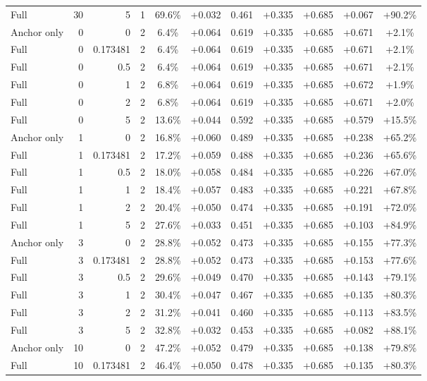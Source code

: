 \begin{table}[htbp]
\begin{tabular}{lrrrccccccc}
Full & 30 & 5 & 1 & 69.6\% & +0.032 & 0.461 & +0.335 & +0.685 & +0.067 & +90.2\% \\
Anchor only & 0 & 0 & 2 & 6.4\% & +0.064 & 0.619 & +0.335 & +0.685 & +0.671 & +2.1\% \\
Full & 0 & 0.173481 & 2 & 6.4\% & +0.064 & 0.619 & +0.335 & +0.685 & +0.671 & +2.1\% \\
Full & 0 & 0.5 & 2 & 6.4\% & +0.064 & 0.619 & +0.335 & +0.685 & +0.671 & +2.1\% \\
Full & 0 & 1 & 2 & 6.8\% & +0.064 & 0.619 & +0.335 & +0.685 & +0.672 & +1.9\% \\
Full & 0 & 2 & 2 & 6.8\% & +0.064 & 0.619 & +0.335 & +0.685 & +0.671 & +2.0\% \\
Full & 0 & 5 & 2 & 13.6\% & +0.044 & 0.592 & +0.335 & +0.685 & +0.579 & +15.5\% \\
Anchor only & 1 & 0 & 2 & 16.8\% & +0.060 & 0.489 & +0.335 & +0.685 & +0.238 & +65.2\% \\
Full & 1 & 0.173481 & 2 & 17.2\% & +0.059 & 0.488 & +0.335 & +0.685 & +0.236 & +65.6\% \\
Full & 1 & 0.5 & 2 & 18.0\% & +0.058 & 0.484 & +0.335 & +0.685 & +0.226 & +67.0\% \\
Full & 1 & 1 & 2 & 18.4\% & +0.057 & 0.483 & +0.335 & +0.685 & +0.221 & +67.8\% \\
Full & 1 & 2 & 2 & 20.4\% & +0.050 & 0.474 & +0.335 & +0.685 & +0.191 & +72.0\% \\
Full & 1 & 5 & 2 & 27.6\% & +0.033 & 0.451 & +0.335 & +0.685 & +0.103 & +84.9\% \\
Anchor only & 3 & 0 & 2 & 28.8\% & +0.052 & 0.473 & +0.335 & +0.685 & +0.155 & +77.3\% \\
Full & 3 & 0.173481 & 2 & 28.8\% & +0.052 & 0.473 & +0.335 & +0.685 & +0.153 & +77.6\% \\
Full & 3 & 0.5 & 2 & 29.6\% & +0.049 & 0.470 & +0.335 & +0.685 & +0.143 & +79.1\% \\
Full & 3 & 1 & 2 & 30.4\% & +0.047 & 0.467 & +0.335 & +0.685 & +0.135 & +80.3\% \\
Full & 3 & 2 & 2 & 31.2\% & +0.041 & 0.460 & +0.335 & +0.685 & +0.113 & +83.5\% \\
Full & 3 & 5 & 2 & 32.8\% & +0.032 & 0.453 & +0.335 & +0.685 & +0.082 & +88.1\% \\
Anchor only & 10 & 0 & 2 & 47.2\% & +0.052 & 0.479 & +0.335 & +0.685 & +0.138 & +79.8\% \\
Full & 10 & 0.173481 & 2 & 46.4\% & +0.050 & 0.478 & +0.335 & +0.685 & +0.135 & +80.3\% \\

\end{tabular}
\end{table}
